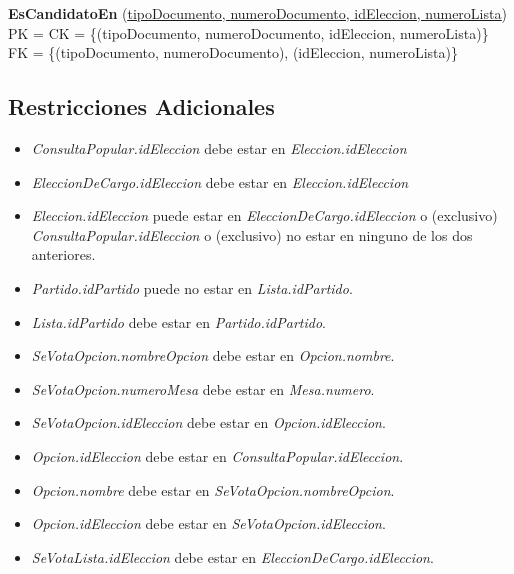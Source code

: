 \documentclass[10pt,a4paper]{article}
\begin{document}
\textbf{EsCandidatoEn}
(\underline{\underline{tipoDocumento}, \underline{numeroDocumento},
\underline{idEleccion},
\underline{numeroLista}})\\
PK = CK = \{(tipoDocumento, numeroDocumento, idEleccion, numeroLista)\}\\
FK = \{(tipoDocumento, numeroDocumento), (idEleccion, numeroLista)\}\\

\subsection{Restricciones Adicionales}
\begin{itemize}
\item \textit{ConsultaPopular.idEleccion} debe estar en \textit{Eleccion.idEleccion}

\item \textit{EleccionDeCargo.idEleccion} debe estar en \textit{Eleccion.idEleccion}

\item \textit{Eleccion.idEleccion} puede estar en \textit{EleccionDeCargo.idEleccion} o (exclusivo) \textit{ConsultaPopular.idEleccion} o (exclusivo) no estar en ninguno de los dos anteriores.

\item \textit{Partido.idPartido} puede no estar en \textit{Lista.idPartido}.

\item \textit{Lista.idPartido} debe estar en \textit{Partido.idPartido}.

\item \textit{SeVotaOpcion.nombreOpcion} debe estar en \textit{Opcion.nombre}.

\item \textit{SeVotaOpcion.numeroMesa} debe estar en \textit{Mesa.numero}.

\item \textit{SeVotaOpcion.idEleccion} debe estar en \textit{Opcion.idEleccion}.

\item \textit{Opcion.idEleccion} debe estar en \textit{ConsultaPopular.idEleccion}.

\item \textit{Opcion.nombre} debe estar en \textit{SeVotaOpcion.nombreOpcion}.

\item \textit{Opcion.idEleccion} debe estar en \textit{SeVotaOpcion.idEleccion}.

\item \textit{SeVotaLista.idEleccion} debe estar en \textit{EleccionDeCargo.idEleccion}.


\end{itemize}
\end{document}
